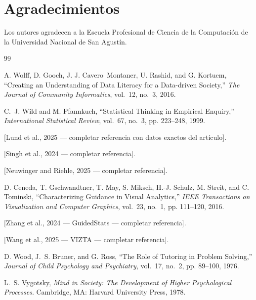 \documentclass[10pt,journal,compsoc]{IEEEtran}
\begin{document}
\section*{Agradecimientos}
Los autores agradecen a la Escuela Profesional de Ciencia de la Computación
de la Universidad Nacional de San Agustín.

\begin{thebibliography}{99}

A. Wolff, D. Gooch, J. J. Cavero~Montaner, U. Rashid, and G. Kortuem,
``Creating an Understanding of Data Literacy for a Data-driven Society,''
\emph{The Journal of Community Informatics}, vol.~12, no.~3, 2016.

C.~J. Wild and M. Pfannkuch, ``Statistical Thinking in Empirical Enquiry,''
\emph{International Statistical Review}, vol.~67, no.~3, pp. 223--248, 1999.

[Lund et al., 2025 — completar referencia con datos exactos del artículo].

[Singh et al., 2024 — completar referencia].

[Neuwinger and Riehle, 2025 — completar referencia].

D. Ceneda, T. Gschwandtner, T. May, S. Miksch, H.-J. Schulz, M. Streit, and
C. Tominski, ``Characterizing Guidance in Visual Analytics,'' \emph{IEEE
Transactions on Visualization and Computer Graphics}, vol.~23, no.~1,
pp. 111--120, 2016.

[Zhang et al., 2024 — GuidedStats — completar referencia].

[Wang et al., 2025 — VIZTA — completar referencia].

D. Wood, J.~S. Bruner, and G. Ross, ``The Role of Tutoring in Problem
Solving,'' \emph{Journal of Child Psychology and Psychiatry}, vol.~17,
no.~2, pp. 89--100, 1976.

L.~S. Vygotsky, \emph{Mind in Society: The Development of Higher
Psychological Processes}. Cambridge, MA: Harvard University Press, 1978.

\end{thebibliography}
\end{document}
